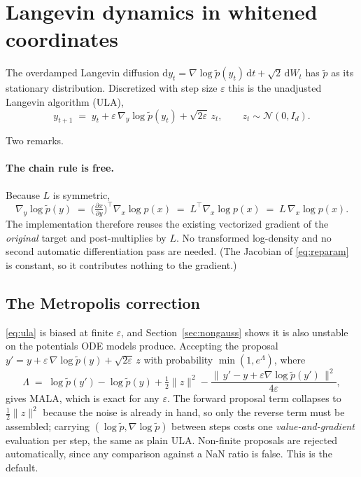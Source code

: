 \documentclass[11pt]{article}
\begin{document}
\section{Langevin dynamics in whitened coordinates}

The overdamped Langevin diffusion
$\mathrm{d}y_t = \nabla \log \tilde p(y_t)\,\mathrm{d}t + \sqrt{2}\,\mathrm{d}W_t$
has $\tilde p$ as its stationary distribution. Discretized with step size $\varepsilon$ this is
the unadjusted Langevin algorithm (ULA),
\begin{equation}
  y_{t+1} \;=\; y_t + \varepsilon\,\nabla_y \log \tilde p(y_t) + \sqrt{2\varepsilon}\, z_t,
  \qquad z_t \sim \mathcal{N}(0, I_d).
  \label{eq:ula}
\end{equation}

Two remarks.

\paragraph{The chain rule is free.} Because $L$ is symmetric,
\begin{equation}
  \nabla_y \log \tilde p(y) \;=\; \Big(\tfrac{\partial x}{\partial y}\Big)^{\!\top}
  \nabla_x \log p(x) \;=\; L^{\!\top}\nabla_x \log p(x) \;=\; L\,\nabla_x \log p(x).
\end{equation}
The implementation therefore reuses the existing vectorized gradient of the \emph{original}
target and post-multiplies by $L$. No transformed log-density and no second automatic
differentiation pass are needed. (The Jacobian of \eqref{eq:reparam} is constant, so it
contributes nothing to the gradient.)

\subsection{The Metropolis correction}
\label{sec:mala}

\eqref{eq:ula} is biased at finite $\varepsilon$, and Section~\ref{sec:nongauss} shows it is
also unstable on the potentials ODE models produce. Accepting the proposal
$y' = y + \varepsilon\,\nabla\log\tilde p(y) + \sqrt{2\varepsilon}\,z$ with probability
$\min(1,e^{\Lambda})$, where
\begin{equation}
  \Lambda \;=\; \log\tilde p(y') - \log\tilde p(y) + \tfrac12\|z\|^2
  - \frac{\big\|\,y'-y+\varepsilon\nabla\log\tilde p(y')\,\big\|^2}{4\varepsilon},
  \label{eq:mala}
\end{equation}
gives MALA, which is exact for any $\varepsilon$. The forward proposal term collapses to
$\tfrac12\|z\|^2$ because the noise is already in hand, so only the reverse term must be
assembled; carrying $(\log\tilde p,\nabla\log\tilde p)$ between steps costs one
\emph{value-and-gradient} evaluation per step, the same as plain ULA. Non-finite proposals are
rejected automatically, since any comparison against a NaN ratio is false. This is the default.
\end{document}

